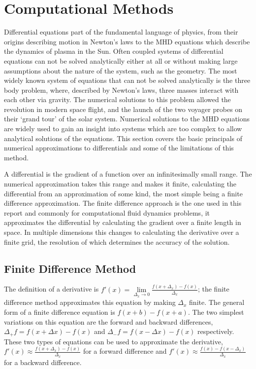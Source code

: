 \section{Computational Methods}\label{sec:numericalmethods}
Differential equations part of the fundamental language of physics, from their origins describing motion in Newton's laws to the MHD equations which describe the dynamics of plasma in the Sun. 
Often coupled systems of differential equations can not be solved analytically either at all or without making large assumptions about the nature of the system, such as the geometry.
The most widely known system of equations that can not be solved analytically is the three body problem, where, described by Newton's laws, three masses interact with each other via gravity.
The numerical solutions to this problem allowed the revolution in modern space flight, and the launch of the two voyager probes on their `grand tour' of the solar system.
Numerical solutions to the MHD equations are widely used to gain an insight into systems which are too complex to allow analytical solutions of the equations.
This section covers the basic principals of numerical approximations to differentials and some of the limitations of this method.

A differential is the gradient of a function over an infinitesimally small range.
The numerical approximation takes this range and makes it finite, calculating the differential from an approximation of some kind, the most simple being a finite difference approximation.
The finite difference approach is the one used in this report and commonly for computational fluid dynamics problems, it approximates the differential by calculating the gradient over a finite length in space.
In multiple dimensions this changes to calculating the derivative over a finite grid, the resolution of which determines the accuracy of the solution.




\subsection{Finite Difference Method}

The definition of a derivative is $f'(x)=\lim\limits _{\Delta_{x}\to0}\frac{f(x+\Delta_{x})-f(x)}{\Delta_{x}}$; the finite difference method approximates this equation by making $\Delta_{x}$ finite.
The general form of a finite difference equation is $f(x+b)-f(x+a)$. The two simplest variations on this equation are the forward and backward differences, $\Delta_{+}f=f(x+\Delta x)-f(x)$ and $\Delta_{-}f=f(x-\Delta x)-f(x)$ respectively.
These two types of equations can be used to approximate the derivative, $f'(x)\approx\frac{f(x+\Delta_{x})-f(x)}{\Delta_{x}}$ for a forward difference and $f'(x)\approx\frac{f(x)-f(x-\Delta_{x})}{\Delta_{x}}$ for a backward difference.

